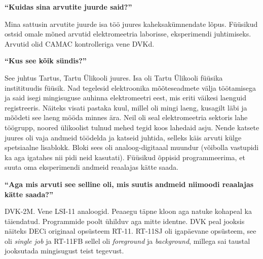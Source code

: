 
\textbf{\enquote{Kuidas sina arvutite juurde said?}}

Mina sattusin arvutite juurde isa töö juures kaheksakümnendate lõpus. Füüsikud ostsid omale mõned arvutid elektromeetria laborisse, eksperimendi juhtimiseks. Arvutid olid CAMAC kontrolleriga vene DVKd.

\textbf{\enquote{Kus see kõik sündis?}}

See juhtus Tartus, Tartu Ülikooli juures. Isa oli Tartu Ülikooli füüsika institituudis füüsik. Nad tegelesid elektroonika mõõteseadmete välja töötamisega ja said isegi mingisuguse auhinna elektromeetri eest, mis eriti väikesi laenguid registreeris. Näiteks visati pastaka kuul, millel oli mingi laeng, kusagilt läbi ja mõõdeti see laeng mööda minnes ära. Neil oli seal elektromeetria sektoris lahe töögrupp, noored ülikoolist tulnud mehed tegid koos lahedaid asju. Nende katsete juures oli vaja andmeid töödelda ja katseid juhtida, selleks käis arvuti külge spetsiaalne lisablokk. Bloki sees oli analoog-digitaaal muundur (võibolla vastupidi ka aga igatahes nii pidi neid kasutati). Füüsikud õppisid programmeerima, et suuta oma eksperimendi andmeid reaalajas kätte saada. 

\textbf{\enquote{Aga mis arvuti see selline oli, mis suutis andmeid niimoodi reaalajas kätte saada?}}

DVK-2M. Vene LSI-11 analoogid. Peaaegu täpne kloon aga natuke kohapeal ka täiendatud. Programmide poolt ühilduv aga mitte identne. DVK peal jooksis näiteks DECi originaal opsüsteem RT-11. RT-11SJ oli igapäevane opsüsteem, see oli \emph{single job} ja RT-11FB sellel oli \emph{foreground} ja \emph{background}, millega sai taustal jooksutada mingisugust teist tegevust. 

